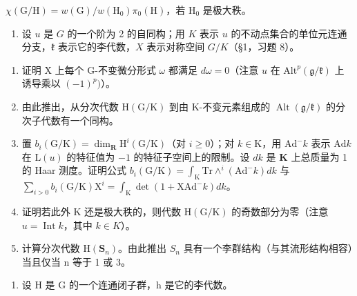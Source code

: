 \begin{enumerate}
\(\chi (\mathrm{G / H}) = w(\mathrm{G}) / w(\mathrm{H}_0)\pi_0(\mathrm{H})\)，若 \(\mathrm{H_0}\) 是极大秩。

\begin{enumerate}
\def\labelenumi{\arabic{enumi})}
\setcounter{enumi}{10}
\tightlist
\item
  设 \(u\) 是 \(G\) 的一个阶为 2 的自同构；用 \(K\) 表示 \(u\) 的不动点集合的单位元连通分支，\(\mathfrak{k}\) 表示它的李代数，\(X\) 表示对称空间 \(G / K\)（§1，习题 8）。
\end{enumerate}

\begin{enumerate}
\def\labelenumi{\alph{enumi})}
\item
  证明 X 上每个 G-不变微分形式 \(\omega\) 都满足 \(d\omega = 0\)（注意 \(u\) 在 \(\mathrm{Alt}^p (\mathfrak{g} / \mathfrak{k})\) 上诱导乘以 \((-1)^p)\)）。
\item
  由此推出，从分次代数 \(\mathrm{H}(\mathrm{G}/\mathrm{K})\) 到由 K-不变元素组成的 \(\operatorname{Alt}(\mathfrak{g}/\mathfrak{k})\) 的分次子代数有一个同构。
\item
  置 \(b_{i}(\mathrm{G / K}) = \dim_{\mathbf{R}}\mathrm{H}^{i}(\mathrm{G / K})\)（对 \(i\geq 0\)）；对 \(k\in \mathrm{K}\)，用 \(\mathrm{Ad}^{-}k\) 表示 \(\mathrm{Ad}k\) 在 \(\mathrm{L}(u)\) 的特征值为 \(-1\) 的特征子空间上的限制。设 \(dk\) 是 \(\mathbf{K}\) 上总质量为 1 的 Haar 测度。证明公式 \(b_{i}(\mathrm{G / K}) = \int_{\mathrm{K}}\mathrm{Tr}\wedge^{i}(\mathrm{Ad}^{-}k)dk\) 与 \(\sum_{i > 0}b_{i}(\mathrm{G / K})\mathrm{X}^{i} = \int_{\mathrm{K}}\det (1 + \mathrm{XAd}^{-}k)dk\)。
\item
  证明若此外 K 还是极大秩的，则代数 \(\mathrm{H}(\mathrm{G}/\mathrm{K})\) 的奇数部分为零（注意 \(u = \operatorname{Int} k\)，其中 \(k \in K\)）。
\item
  计算分次代数 \(\mathrm{H}(\mathbf{S}_{n})\)。由此推出 \(S_{n}\) 具有一个李群结构（与其流形结构相容）当且仅当 n 等于 1 或 3。
\end{enumerate}

\begin{enumerate}
\def\labelenumi{\arabic{enumi})}
\setcounter{enumi}{11}
\tightlist
\item
  设 H 是 G 的一个连通闭子群，h 是它的李代数。
\end{enumerate}


\end{enumerate}
